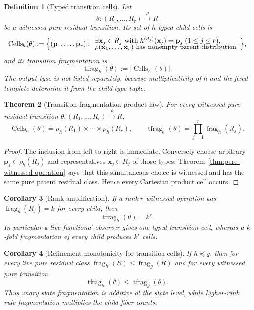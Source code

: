 \documentclass[11pt]{article}
\newtheorem{definition}{Definition}[section]
\newtheorem{theorem}[definition]{Theorem}
\newtheorem{corollary}[definition]{Corollary}
\newcommand{\frag}{\operatorname{frag}}
\newcommand{\tfrag}{\operatorname{tfrag}}
\newcommand{\Cells}{\operatorname{Cells}}
\begin{document}
\begin{definition}[Typed transition cells]
Let
\[
  \theta:(R_1,\ldots,R_r)\xrightarrow{\rho}R
\]
be a witnessed pure residual transition.  Its set of $h$-typed child cells is
\[
 \Cells_h(\theta)
 :=\Bigl\{(\mathbf p_1,\ldots,\mathbf p_r):
     \begin{array}{l}
     \exists\mathbf x_j\in R_j\text{ with }
     h^{(d_j)}(\mathbf x_j)=\mathbf p_j\ (1\le j\le r),\\[-1mm]
     \rho(\mathbf x_1,\ldots,\mathbf x_r)
     \text{ has nonempty parent distribution}
     \end{array}
     \Bigr\},
\]
and its \emph{transition fragmentation} is
\[
  \tfrag_h(\theta):=|\Cells_h(\theta)|.
\]
The output type is not listed separately, because multiplicativity of $h$ and
the fixed template determine it from the child-type tuple.
\end{definition}

\begin{theorem}[Transition-fragmentation product law]
\label{thm:tfrag-product}
For every witnessed pure residual transition
$\theta:(R_1,\ldots,R_r)\xrightarrow{\rho}R$,
\[
 \boxed{
   \Cells_h(\theta)
   =\rho_h(R_1)\times\cdots\times\rho_h(R_r),
   \qquad
   \tfrag_h(\theta)
   =\prod_{j=1}^r\frag_h(R_j).
 }
\]
\end{theorem}

\begin{proof}
The inclusion from left to right is immediate.  Conversely choose arbitrary
$\mathbf p_j\in\rho_h(R_j)$ and representatives $\mathbf x_j\in R_j$ of those
types.  Theorem~\ref{thm:pure-witnessed-operation} says that this simultaneous
choice is witnessed and has the same pure parent residual class.  Hence every
Cartesian product cell occurs.
\end{proof}

\begin{corollary}[Rank amplification]
\label{cor:rank-amplification}
If a rank-$r$ witnessed operation has $\frag_h(R_j)=k$ for every child, then
\[
  \boxed{\tfrag_h(\theta)=k^r.}
\]
In particular a live-functional observer gives one typed transition cell,
whereas a $k$-fold fragmentation of every child produces $k^r$ cells.
\end{corollary}

\begin{corollary}[Refinement monotonicity for transition cells]
If $h\preceq g$, then for every live pure residual class
$\frag_h(R)\le\frag_g(R)$ and for every witnessed pure transition
\[
  \tfrag_h(\theta)\le\tfrag_g(\theta).
\]
Thus unary state fragmentation is additive at the state level, while
higher-rank rule fragmentation multiplies the child-fiber counts.
\end{corollary}
\end{document}
